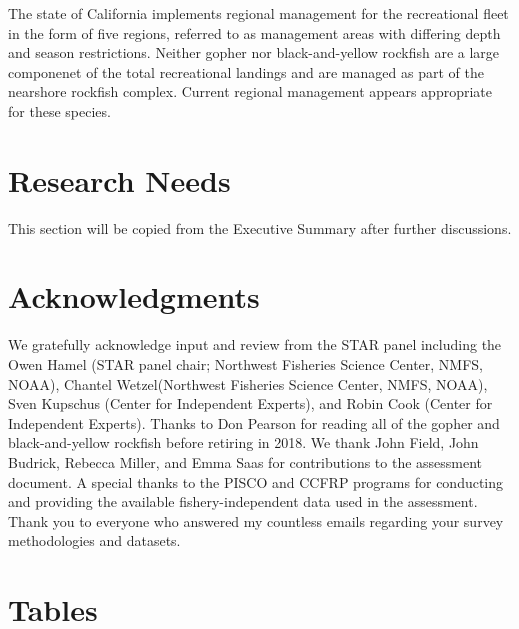 \documentclass[12pt,]{article}
\begin{document}
The state of California implements regional management for the
recreational fleet in the form of five regions, referred to as
management areas with differing depth and season restrictions. Neither
gopher nor black-and-yellow rockfish are a large componenet of the total
recreational landings and are managed as part of the\\
nearshore rockfish complex. Current regional management appears
appropriate for these species.

\section{Research Needs}\label{research-needs}

This section will be copied from the Executive Summary after further
discussions.

\section{Acknowledgments}\label{acknowledgments}

We gratefully acknowledge input and review from the STAR panel including
the Owen Hamel (STAR panel chair; Northwest Fisheries Science Center,
NMFS, NOAA), Chantel Wetzel(Northwest Fisheries Science Center, NMFS,
NOAA), Sven Kupschus (Center for Independent Experts), and Robin Cook
(Center for Independent Experts). Thanks to Don Pearson for reading all
of the gopher and black-and-yellow rockfish before retiring in 2018. We
thank John Field, John Budrick, Rebecca Miller, and Emma Saas for
contributions to the assessment document. A special thanks to the PISCO
and CCFRP programs for conducting and providing the available
fishery-independent data used in the assessment. Thank you to everyone
who answered my countless emails regarding your survey methodologies and
datasets.

\newpage

\FloatBarrier

\section{Tables}\label{tables}

\FloatBarrier
\end{document}
